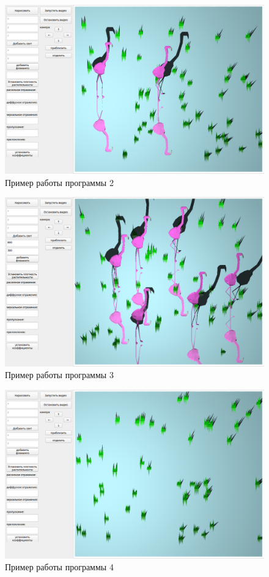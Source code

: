 \begin{figure}[h!]
	\centering
	\includegraphics[width=0.9\linewidth]{img/ex2}
	\caption{Пример работы программы 2}
	\label{fig:ex2}
\end{figure}

\begin{figure}[h!]
	\centering
	\includegraphics[width=0.9\linewidth]{img/ex3}
	\caption{Пример работы программы 3}
	\label{fig:ex3}
\end{figure}

\begin{figure}[h!]
	\centering
	\includegraphics[width=0.9\linewidth]{img/ex4}
	\caption{Пример работы программы 4}
	\label{fig:ex4}
\end{figure}


